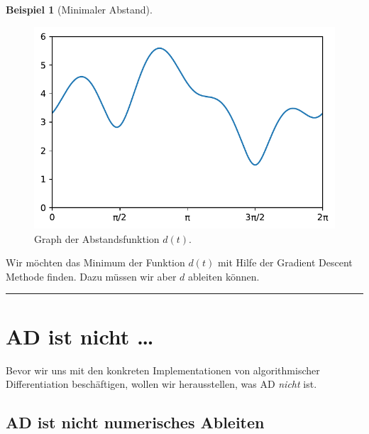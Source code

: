 \documentclass[
  a4paper,
  DIV=11]{scrreprt}
\theoremstyle{definition}
\theoremstyle{definition}
\newtheorem{example}{Beispiel}[chapter]
\theoremstyle{remark}
\begin{document}
\begin{example}[Minimaler
Abstand]
\begin{figure}[H]

{\centering \includegraphics{intro_files/figure-pdf/fig-graphofdistanceproblem-output-1.pdf}

}

\caption{\label{fig-graphofdistanceproblem}Graph der Abstandsfunktion
\(d(t)\).}

\end{figure}

Wir möchten das Minimum der Funktion \(d(t)\) mit Hilfe der Gradient
Descent Methode finden. Dazu müssen wir aber \(d\) ableiten können.

\end{example}

\begin{center}\rule{0.5\linewidth}{0.5pt}\end{center}


\hypertarget{sec-ADisnot}{%
\chapter{AD ist nicht \ldots{}}\label{sec-ADisnot}}

Bevor wir uns mit den konkreten Implementationen von algorithmischer
Differentiation beschäftigen, wollen wir herausstellen, was AD
\emph{nicht} ist.

\hypertarget{sec-ADnotNumDiff}{%
\section{AD ist nicht numerisches Ableiten}\label{sec-ADnotNumDiff}}
\end{document}
